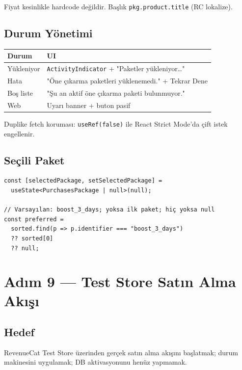 \documentclass[12pt,a4paper]{article}
\begin{document}
Fiyat kesinlikle hardcode değildir. Başlık \texttt{pkg.product.title} (RC lokalize).

\subsection{Durum Yönetimi}

\begin{center}
\begin{tabular}{ll}
  \toprule
  \textbf{Durum} & \textbf{UI}\\
  \midrule
  Yükleniyor & \texttt{ActivityIndicator} + "Paketler yükleniyor\ldots"\\
  Hata & "Öne çıkarma paketleri yüklenemedi." + Tekrar Dene\\
  Boş liste & "Şu an aktif öne çıkarma paketi bulunmuyor."\\
  Web & Uyarı banner + buton pasif\\
  \bottomrule
\end{tabular}
\end{center}

Duplike fetch koruması: \texttt{useRef(false)} ile React Strict Mode'da çift istek engellenir.

\subsection{Seçili Paket}

\begin{lstlisting}[language={}]
const [selectedPackage, setSelectedPackage] =
  useState<PurchasesPackage | null>(null);

// Varsayılan: boost_3_days; yoksa ilk paket; hiç yoksa null
const preferred =
  sorted.find(p => p.identifier === "boost_3_days")
  ?? sorted[0]
  ?? null;
\end{lstlisting}

\section{Adım 9 — Test Store Satın Alma Akışı}

\subsection{Hedef}

RevenueCat Test Store üzerinden gerçek satın alma akışını başlatmak;
durum makinesini uygulamak; DB aktivasyonunu henüz yapmamak.
\end{document}
